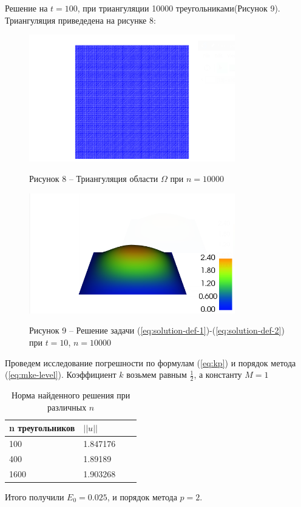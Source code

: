 Решение на $t=100$, при триангуляции 10000 треугольниками(Рисунок 9). Триангуляция приведедена на рисунке 8:
\begin{figure}[H]
      \centering
      \includegraphics[width=0.8\textwidth]{plots/n100_polygons.png}\\
      \centering\caption*{Рисунок 8 -- Триангуляция области $\Omega$ при $n=10000$}
\end{figure}
\begin{figure}[H]
      \centering
      \includegraphics[width=0.8\textwidth]{plots/n100t10.png}\\
  \centering\caption*{Рисунок 9 -- Решение задачи (\ref{eq:solution-def-1})-(\ref{eq:solution-def-2}) при $t=10$, $n=10000$}
\end{figure}

Проведем исследование погрешности по формулам (\ref{eq:kp}) и порядок метода (\ref{eq:mke-level}). Коэффициент $k$ возьмем равным $\frac{1}{2}$,
а константу $M=1$\\
\newpage
\begin{table}
    \begin{center}
        \begin{tabular}{ | l | l | l | p{5cm} |}
            \hline
            n треугольников & $||u||$ \\ \hline
            100 &  1.847176 \\
            400 & 1.89189 \\
            1600 & 1.903268 \\
            \hline
        \end{tabular}
        \caption{Норма найденного решения при различных $n$}
    \end{center}
\end{table}
Итого получили $E_0=0.025$, и порядок метода $p=2$.
\newpage
